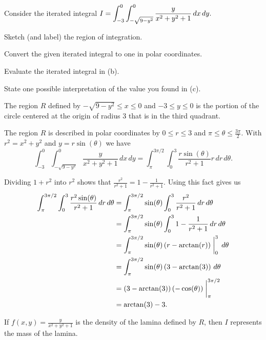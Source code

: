 \begin{exercises} 

\item Consider the iterated integral $I = \displaystyle \int_{-3}^{0} \int_{-\sqrt{9-y^2}}^{0} \frac{y}{x^2 + y^2+1} \, dx \, dy.$  
	
\ba
	\item Sketch (and label) the region of integration.
	\item Convert the given iterated integral to one in polar coordinates.
	\item Evaluate the iterated integral in (b).
	\item State one possible interpretation of the value you found in (c).
\ea

\begin{exerciseSolution}
\ba
	\item The region $R$ defined by $-\sqrt{9-y^2} \leq x \leq 0$ and $-3 \leq y \leq 0$ is the portion of the circle centered at the origin of radius 3 that is in the third quadrant. 
	\item The region $R$ is described in polar coordinates by $0 \leq r \leq 3$ and $\pi \leq \theta \leq \frac{3 \pi}{2}$. With $r^2=x^2+y^2$ and $y = r\sin(\theta)$ we have  
\[\int_{-3}^{0} \int_{-\sqrt{9-y^2}}^{0} \frac{y}{x^2 + y^2+1} \, dx \, dy = \int_{\pi}^{3\pi/2} \int_{0}^{3} \frac{r\sin(\theta)}{r^2+1} r \, dr \, d\theta.\]

	\item Dividing $1+r^2$ into $r^2$ shows that $\frac{r^2}{r^2+1} = 1 - \frac{1}{r^2+1}$. Using this fact gives us 
\begin{align*}
\int_{\pi}^{3\pi/2} \int_{0}^{3} \frac{r^2\sin(\theta)}{r^2+1} \, dr \, d\theta &= \int_{\pi}^{3\pi/2} \sin(\theta) \int_{0}^{3} \frac{r^2}{r^2+1} \, dr \, d\theta \\
	&= \int_{\pi}^{3\pi/2} \sin(\theta) \int_{0}^{3} 1-\frac{1}{r^2+1} \, dr \, d\theta \\
	&= \int_{\pi}^{3\pi/2} \sin(\theta)  \left(r-\arctan(r)\right)\biggm|_{0}^{3} \, d\theta \\
	&= \int_{\pi}^{3\pi/2} \sin(\theta)  \left(3-\arctan(3)\right) \, d\theta \\
	&= \left(3-\arctan(3)\right) (-\cos(\theta))\biggm|_{\pi}^{3\pi/2}	 \\
	&= \arctan(3)-3.
\end{align*}
 
	\item If $f(x,y) = \frac{y}{x^2 + y^2+1}$ is the density of the lamina defined by $R$, then $I$ represents the mass of the lamina.
\ea
\end{exerciseSolution}


\end{exercises}
